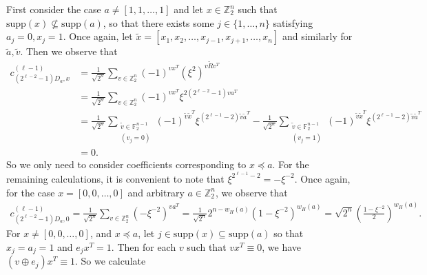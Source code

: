 \documentclass[twoside,romanappendices]{IEEEtran}
\newcommand{\Fn}{\mathbb{Z}_2^n}
\begin{document}
First consider the case $a \neq [1,1,\ldots,1]$ and let $x \in \Fn$ such that $\text{supp}(x) \nsubseteq \text{supp}(a)$, so that there exists some $j \in \{1,\ldots,n\}$ satisfying $a_j = 0, x_j = 1$.
Once again, let $\tilde{x} = [x_1,x_2,\ldots,x_{j-1},x_{j+1},\ldots,x_n]$ and similarly for $\tilde{a}, \tilde{v}$.
Then we observe that
\begin{align}
c_{(2^{\ell-2} - 1) D_a,x}^{(\ell-1)} & = \frac{1}{\sqrt{2^n}} \sum_{v \in \Fn} (-1)^{vx^T} (\xi^2)^{v \tilde{R} v^T} \\
%
  & = \frac{1}{\sqrt{2^n}} \sum_{v \in \Fn} (-1)^{vx^T} \xi^{2(2^{\ell-2} - 1) va^T} \\
%
  & = \frac{1}{\sqrt{2^n}} \sum_{\substack{\tilde{v} \in \mathbb{F}_2^{n-1}\\(v_j = 0)}} (-1)^{\tilde{v} \tilde{x}^T} \xi^{(2^{\ell-1} - 2) \tilde{v} \tilde{a}^T} - \frac{1}{\sqrt{2^n}} \sum_{\substack{\tilde{v} \in \mathbb{F}_2^{n-1}\\(v_j = 1)}} (-1)^{\tilde{v} \tilde{x}^T} \xi^{(2^{\ell-1} - 2) \tilde{v} \tilde{a}^T} \\
%
  & = 0.
\end{align}
So we only need to consider coefficients corresponding to $x \preceq a$.
For the remaining calculations, it is convenient to note that $\xi^{2^{\ell-1} - 2} = - \xi^{-2}$.
Once again, for the case $x = [0,0,\ldots,0]$ and arbitrary $a \in \Fn$, we observe that
\begin{align}
\label{eq:trans_root_T_coeff_x_0}
c_{(2^{\ell-2} - 1) D_a,0}^{(\ell-1)} = \frac{1}{\sqrt{2^n}} \sum_{v \in \Fn} (-\xi^{-2})^{v a^T} = \frac{1}{\sqrt{2^n}} 2^{n - w_H(a)} (1 - \xi^{-2})^{w_H(a)} = \sqrt{2^n} \left( \frac{1 - \xi^{-2}}{2} \right)^{w_H(a)}.
\end{align}
For $x \neq [0,0,\ldots,0]$, and $x \preceq a$, let $j \in \text{supp}(x) \subseteq \text{supp}(a)$ so that $x_j = a_j = 1$ and $e_j x^T = 1$.
Then for each $v$ such that $vx^T \equiv 0$, we have $(v \oplus e_j) x^T \equiv 1$.
So we calculate
\end{document}
